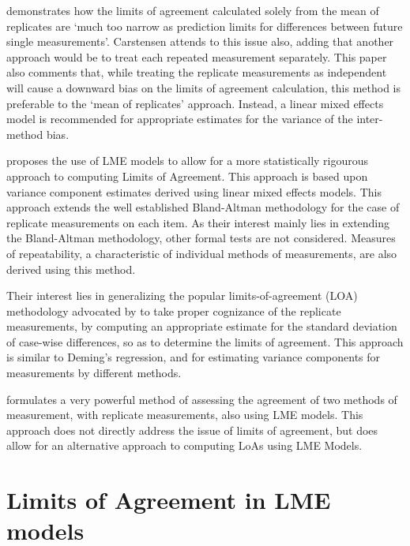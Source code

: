 \documentclass[12pt, a4paper]{report}
\theoremstyle{plain}
\theoremstyle{definition}
\theoremstyle{remark}
\begin{document}
	\citet{BXC2008} demonstrates how the limits of agreement calculated solely from the mean of replicates are `much too narrow as
	prediction limits for differences between future single measurements'. Carstensen attends to this issue also, adding that another approach would be to treat each repeated measurement separately. This paper also comments that, while treating the
	replicate measurements as independent will cause a downward bias
	on the limits of agreement calculation, this method is preferable to the `mean of replicates' approach. Instead, a linear mixed effects model is recommended for appropriate estimates for the variance of the inter-method bias. 
	
	
	
	\citet{BXC2008} proposes the use of LME models to allow for a more statistically rigourous approach to computing Limits of Agreement. This approach is based upon variance component estimates derived using
	linear mixed effects models. This approach extends the well established Bland-Altman methodology for the case of replicate measurements on each item. As their interest mainly lies in extending the Bland-Altman methodology, other formal tests are not considered.  Measures of repeatability, a
	characteristic of individual methods of measurements, are also
	derived using this method.
	
	
	Their interest lies in generalizing the popular limits-of-agreement (LOA) methodology advocated by \citet{BA86} to take proper cognizance of the replicate measurements, by computing an appropriate estimate for the standard deviation of case-wise differences, so as to determine the limits of agreement.  This approach is similar to Deming's regression, and for estimating variance components for measurements by different methods. 
	
	
	\citet{ARoy2009} formulates a very powerful method of assessing the agreement of two methods of measurement, with replicate measurements, also using LME models. This approach does not directly address the issue of limits of agreement, but does allow for an alternative approach to computing LoAs using LME Models.
	
	\section{Limits of Agreement in LME models}
	
\end{document}
